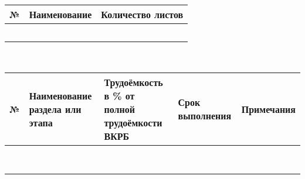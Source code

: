 \documentclass{article}
\begin{document}
\begin{center}
\makebox{\rlap{\hspace{0.5cm}} \rule[-2pt]{\linegoal}{0.5pt}} \\
\makebox{\rlap{\hspace{0.5cm}} \rule[-2pt]{\linegoal}{0.5pt}} \\
\makebox{\rlap{\hspace{0.5cm}} \rule[-2pt]{\linegoal}{0.5pt}} \\
\makebox{\rlap{\hspace{0.5cm}} \rule[-2pt]{\linegoal}{0.5pt}} \\
\vspace{14pt}
 \\
\vspace{14pt}
\begin{tabularx}{\textwidth}{|l|Y|Y|}
    \hline
    \rule{0pt}{14pt}№ & Наименование & Количество листов \\    
\hline
 \rule{0pt}{14pt} & & \\
  \hline
 \rule{0pt}{14pt} & & \\
  \hline
 \rule{0pt}{14pt} & & \\
  \hline
 \rule{0pt}{14pt} & & \\
  \hline
 \rule{0pt}{14pt} & & \\
  \hline
\end{tabularx}

\vspace{14pt}
 \\
\begin{tabularx}{\textwidth}{|p{0.75cm}|Y|Y|Y|Y|}
\hline
\rule{0pt}{14pt}№ & Наименование раздела или этапа & Трудоёмкость в \% от полной трудоёмкости ВКРБ &
Срок выполнения & Примечания\\    
\hline
\rule{0pt}{14pt} & & & &\\
\hline
\rule{0pt}{14pt} & & & &\\
\hline
\rule{0pt}{14pt} & & & &\\
\hline
\rule{0pt}{14pt} & & & &\\
\hline
\rule{0pt}{14pt} & & & &\\
\hline
\rule{0pt}{14pt} & & & &\\
\hline
\rule{0pt}{14pt} & & & &\\
\hline
\rule{0pt}{14pt} & & & &\\
\hline
\end{tabularx}


\end{center}
\end{document}

